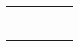 \documentclass[12pt,a4paper]{article}
\begin{document}
\begin{landscape}
\begin{table}[ht!]
\begin{tabular}{|c|l|l|l|c|c|}
			                                                       &                           &                                     &              &                                                                                     &                                                                  \\\cline{3-4}
			                                                       &                           & \multirow{1}{*}{\gbbbbbbbbbb}       &              &                                                                                     &                                                                  \\\cline{3-4}
			                                                       &                           & \multirow{2}{*}{\gbbbbbbbbbbb}      &              &                                                                                     &                                                                  \\\cline{4-4}
			                                                       &                           &                                     &              &                                                                                     &                                                                  \\\cline{3-4}
			                                                       &                           & \multirow{2}{*}{\gbbbbbbbbbbbb}     &              &                                                                                     &                                                                  \\\cline{4-4}
			                                                       &                           &                                     &              &                                                                                     &                                                                  \\\cline{2-4}
			                                                       & \multirow{7}{*}{\dimiiii} & \multirow{2}{*}{\gbbbbbbbbbbbbb}    &              &                                                                                     &                                                                  \\\cline{4-4}
			                                                       &                           &                                     &              &                                                                                     &                                                                  \\\cline{3-4}

\end{tabular}
\end{table}
\end{landscape}
\end{document}
